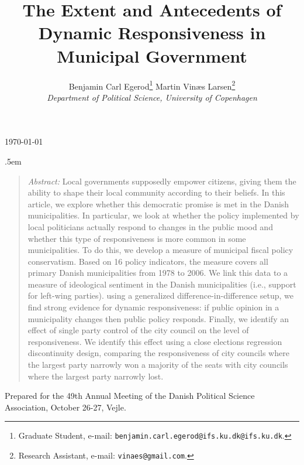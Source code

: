 \documentclass[a4paper,11pt]{article}
\title{\bigskip \bigskip \sffamily \LARGE The Extent and Antecedents of Dynamic Responsiveness in Municipal Government}
\author{\bigskip Benjamin Carl Egerod\footnote{Graduate Student, e-mail: \texttt{benjamin.carl.egerod@ifs.ku.dk@ifs.ku.dk}.} \qquad Martin Vinæs Larsen\footnote{Research Assistant, e-mail: \texttt{vinaes@gmail.com}.} \\ \textit{Department of Political Science, University of Copenhagen}} %
\makeatletter
\renewcommand{\maketitle}{
	\begin{flushleft}
		
		\onehalfspacing
		
		\@title
		
		\lineskip .5em
		\normalfont{\normalsize{\@author}}
\end{flushleft}}
\makeatother
\begin{document}
	
	
	
	
	
	
	\begin{footnotesize} \noindent \today \end{footnotesize} %
	
	\vspace{0.7in}
	
	\maketitle
	
	\bigskip
	
	\begin{quotation} %

		\small \noindent \emph{Abstract:} Local governments supposedly empower citizens, giving them the ability to shape their local community according to their beliefs. In this article, we explore whether this democratic promise is met in the Danish municipalities. In particular, we look at whether the policy implemented by local politicians actually respond to changes in the public mood and whether this type of responsiveness is more common in some municipalities. To do this, we develop a measure of municipal fiscal policy conservatism. Based on 16 policy indicators, the measure covers all primary Danish municipalities from 1978 to 2006. We link this data to a measure of ideological sentiment in the Danish municipalities (i.e., support for left-wing parties). using a generalized difference-in-difference setup, we find strong evidence for dynamic responsiveness: if public opinion in a municipality changes then public policy responds. Finally, we identify an effect of single party control of the city council on the level of responsiveness. We identify this effect using a close elections regression discontinuity design, comparing the responsiveness of city councils where the largest party narrowly won a majority of the seats with city councils where the largest party narrowly lost.
	\end{quotation}

\bigskip

\bigskip

\bigskip
	
	
	\noindent \footnotesize{Prepared for the 49th Annual Meeting of the Danish Political Science Association, October 26-27, Vejle.}
	
	\thispagestyle{empty} %
	
\end{document}
